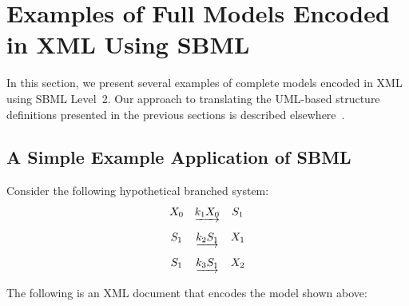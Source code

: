 \documentclass[10pt]{cekarticle}
\begin{document}
\section{Examples of Full Models Encoded in XML Using SBML}
\label{sec:xml-rep}

In this section, we present several examples of complete models
encoded in XML using SBML Level~2.  Our approach to translating
the UML-based structure definitions presented in the previous
sections is described elsewhere~\citep{hucka:2000b}.


\subsection{A Simple Example Application of SBML}

Consider the following hypothetical branched system:
\begin{equation*}
  \begin{array}{@{}ccc@{}}
    X_0 & \underrightarrow{k_1 X_0} & S_1 \\ \\[-4pt]
    S_1 & \underrightarrow{k_2 S_1} & X_1 \\ \\[-4pt]
    S_1 & \underrightarrow{k_3 S_1} & X_2
  \end{array}
\end{equation*}

The following is an XML document that encodes the model shown
above:
\end{document}
